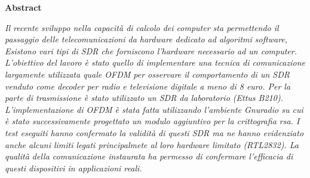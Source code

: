 \thispagestyle{empty}

\begin{center}
  {\bf \Huge Abstract}
\end{center}

\vspace{4cm}


\emph{
	Il recente sviluppo nella capacità di calcolo dei computer sta permettendo il passaggio delle telecomunicazioni da hardware dedicato ad algoritmi software, Esistono vari tipi di SDR che forniscono l'hardware necessario ad un computer. L'obiettivo del lavoro è stato quello di implementare una tecnica di comunicazione largamente utilizzata quale OFDM per osservare il comportamento di un SDR venduto come decoder per radio e televisione digitale a meno di 8 euro. Per la parte di trasmissione è stato utilizzato un SDR da laboratorio (Ettus B210). L'implementazione di OFDM è stata fatta utilizzando l'ambiente Gnuradio su cui è stato successivamente progettato un modulo aggiuntivo per la crittografia rsa. I test eseguiti hanno confermato la validità di questi SDR ma ne hanno evidenziato anche alcuni limiti legati principalmete al loro hardware limitato (RTL2832). La qualità della comunicazione instaurata ha permesso di confermare l'efficacia di questi dispositivi in applicazioni reali.}
